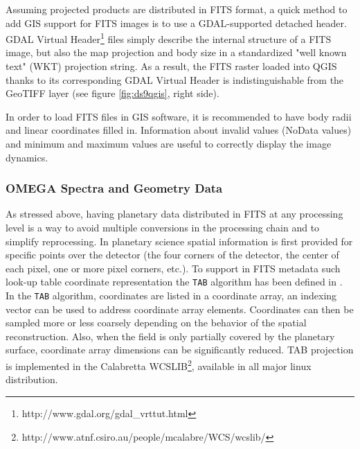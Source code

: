 Assuming projected products are distributed in FITS format, a quick method to add GIS
support for FITS images is to use a GDAL-supported detached header.
GDAL Virtual Header\footnote{http://www.gdal.org/gdal\_vrttut.html}
files simply describe the internal structure of a FITS image, but
also the map projection and body size in a standardized "well known text"
(WKT) projection string.
As a result, the FITS raster loaded into QGIS thanks to its corresponding GDAL Virtual
Header is indistinguishable from the GeoTIFF layer (see figure \ref{fig:ds9qgis},
right side).

In order to load FITS files in GIS software, it is recommended to have
body radii and linear coordinates filled in.
Information about invalid values (NoData values) and minimum and maximum values are
useful to correctly display the image dynamics.

\subsubsection{OMEGA Spectra and Geometry Data}
As stressed above, having planetary data distributed in FITS at any processing level is
a way to avoid multiple conversions in the processing chain and to simplify
reprocessing.
In planetary science spatial information is first provided for specific points over
the detector (the four corners of the detector, the center of each pixel,
one or more pixel corners, etc.).
To support in FITS metadata such look-up table coordinate representation the
\texttt{TAB} algorithm has been defined in \citet{wcsspectral}.
In the \texttt{TAB} algorithm, coordinates are listed in a coordinate array,
an indexing vector can be used to address coordinate array elements.
Coordinates can then be sampled more or less coarsely depending on the behavior of the
spatial reconstruction.
Also, when the field is only partially covered by the planetary surface, coordinate
array dimensions can be significantly reduced. 
TAB projection is implemented in the Calabretta WCSLIB\footnote{http://www.atnf.csiro.au/people/mcalabre/WCS/wcslib/},
available in all major linux distribution.

